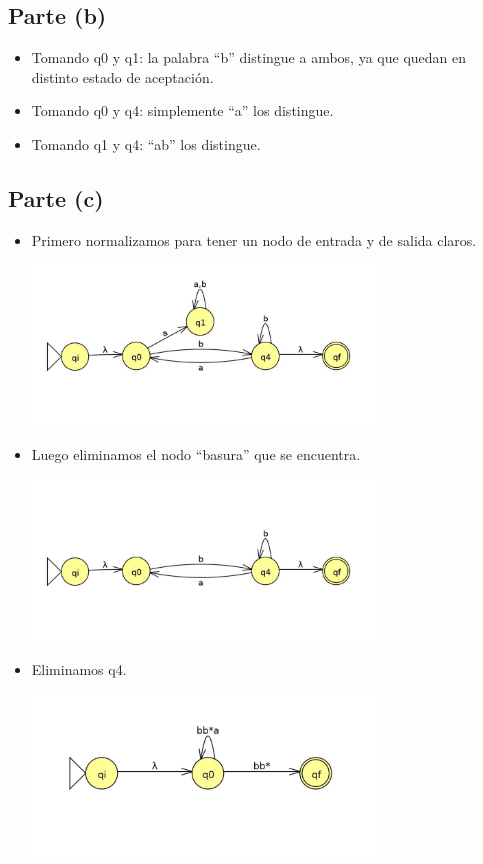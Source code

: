 \documentclass[11pt,letterpaper]{article}
\begin{document}
\subsection{Parte (b)}
\begin{itemize}
	\item{Tomando q0 y q1: la palabra ``b'' distingue a ambos, ya que quedan en distinto estado de aceptación.}
	\item{Tomando q0 y q4: simplemente ``a'' los distingue.}
	\item{Tomando q1 y q4: ``ab'' los distingue.}
\end{itemize}

\subsection{Parte (c)}
\begin{itemize}
\item{Primero normalizamos para tener un nodo de entrada y de salida claros.}
\begin{center}
\includegraphics[height=4.3cm]{tarea_1-c.png}
\end{center}
\item{Luego eliminamos el nodo ``basura'' que se encuentra.}
\begin{center}
\includegraphics[height=4.3cm]{tarea_1-c2.png}
\end{center}
\item{Eliminamos q4.}
\begin{center}
\includegraphics[height=4.3cm]{tarea_1-c3.png}

\end{center}
\end{itemize}
\end{document}

